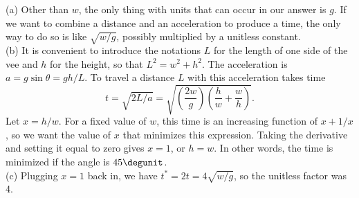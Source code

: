 (a) Other than $w$, the only thing with units that can occur in our answer is $g$.
If we want to combine a distance and an acceleration to produce a time, the
only way to do so is like $\sqrt{w/g}$, possibly multiplied by a unitless constant.\\
(b) It is convenient to introduce the notations $L$ for the length of one side of
the vee and $h$ for the height, so that $L^2=w^2+h^2$.
The acceleration is $a=g\sin\theta=gh/L$. To travel a distance $L$ with this
acceleration takes time
\begin{equation*}
  t=\sqrt{2L/a}=\sqrt{\left(\frac{2w}{g}\right)\left(\frac{h}{w}+\frac{w}{h}\right)}.
\end{equation*}
Let $x=h/w$. For a fixed value of $w$, this time is an increasing function of
$x+1/x$, so we want the value of $x$ that minimizes this expression.
Taking the derivative and setting it equal to zero gives $x=1$, or $h=w$.
In other words, the time is minimized if the angle is $45\degunit$.\\
(c) Plugging $x=1$ back in, we have $t^*=2t=4\sqrt{w/g}$, so the unitless factor
was 4.
